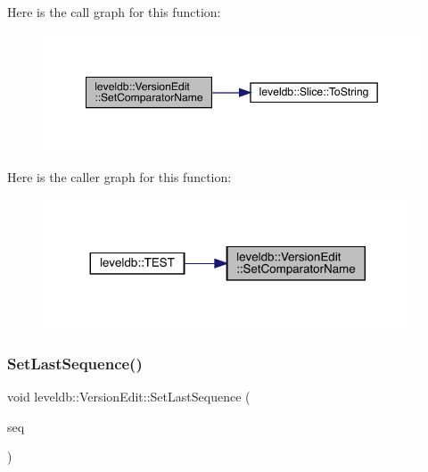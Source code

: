 Here is the call graph for this function\+:
\nopagebreak
\begin{figure}[H]
\begin{center}
\leavevmode
\includegraphics[width=349pt]{classleveldb_1_1_version_edit_ab562147cdd82b184e86e88bd375a718c_cgraph}
\end{center}
\end{figure}
Here is the caller graph for this function\+:
\nopagebreak
\begin{figure}[H]
\begin{center}
\leavevmode
\includegraphics[width=311pt]{classleveldb_1_1_version_edit_ab562147cdd82b184e86e88bd375a718c_icgraph}
\end{center}
\end{figure}
\mbox{\label{classleveldb_1_1_version_edit_abd6e841ed400672d33d26f4b187a66bf}} 
\subsubsection{\texorpdfstring{SetLastSequence()}{SetLastSequence()}}
{\footnotesize\ttfamily void leveldb\+::\+Version\+Edit\+::\+Set\+Last\+Sequence (\begin{DoxyParamCaption}\item[{\mbox{\hyperlink{namespaceleveldb_a5481ededd221c36d652c371249f869fa}{Sequence\+Number}}}]{seq }\end{DoxyParamCaption})\hspace{0.3cm}{\ttfamily [inline]}}

